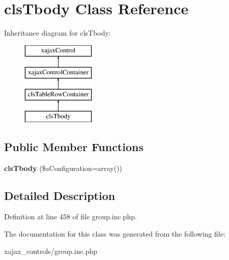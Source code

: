 \hypertarget{classclsTbody}{
\section{clsTbody Class Reference}
\label{classclsTbody}
}
Inheritance diagram for clsTbody:\begin{figure}[H]
\begin{center}
\leavevmode
\includegraphics[height=4.000000cm]{classclsTbody}
\end{center}
\end{figure}
\subsection*{Public Member Functions}
\begin{DoxyCompactItemize}
\item 
\hypertarget{classclsTbody_a9990ab1046b895b0b8f2f84a0539f62b}{
{\bfseries clsTbody} (\$aConfiguration=array())}
\label{classclsTbody_a9990ab1046b895b0b8f2f84a0539f62b}

\end{DoxyCompactItemize}


\subsection{Detailed Description}


Definition at line 458 of file group.inc.php.



The documentation for this class was generated from the following file:\begin{DoxyCompactItemize}
\item 
xajax\_\-controls/group.inc.php\end{DoxyCompactItemize}
